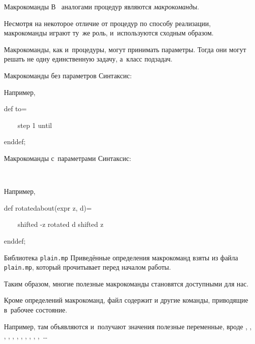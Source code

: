 \begin{frame}{Макрокоманды}
В~ аналогами процедур являются \emph{макрокоманды}.

Несмотря на некоторое отличие от процедур по способу реализации, макрокоманды
играют ту~же роль, и~используются сходным образом.

Макрокоманды, как и~процедуры, могут принимать параметры. Тогда они могут
решать не одну единственную задачу, а~класс подзадач.
\end{frame}

\begin{frame}{Макрокоманды без параметров}
Синтаксис:
\begin{center}
\LARGE
{}\literal{=}
\end{center}

Например,
\begin{programlisting}
\Large
def \alert{to}=\par
~~~~\alert{step 1 until}\par
enddef;
\end{programlisting}
\end{frame}

\begin{frame}{Макрокоманды с~параметрами}
Синтаксис:
\begin{center}
\LARGE
{}\literal{)=}\\
 
\end{center}

Например,
\begin{programlisting}
\Large
def \alert{rotatedabout}(expr \alert{z, d})=\par
~~~~\alert{shifted -z rotated d shifted z}\par
enddef;
\end{programlisting}
\end{frame}

\begin{frame}{Библиотека \nolinkurl{plain.mp}}
Приведённые определения макрокоманд взяты из файла \nolinkurl{plain.mp}, который
 прочитывает перед началом работы.

Таким образом, многие полезные макрокоманды становятся доступными для нас.

Кроме определений макрокоманд, файл содержит и другие команды, приводящие
 в~рабочее состояние.

Например, там объявляются и~получают значения полезные переменные, вроде
, , , , ,
, , , ,
, ,~…
\end{frame}

